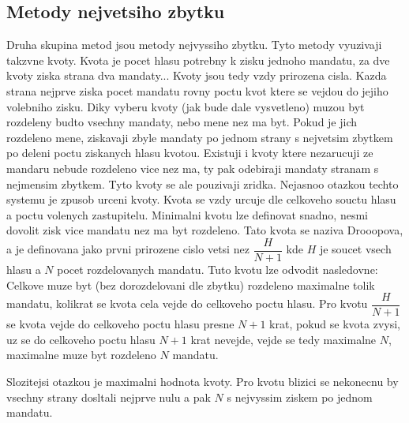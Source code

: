\documentclass[12pt,a4paper]{article}
\begin{document}
\subsection{Metody nejvetsiho zbytku}
Druha skupina metod jsou metody nejvyssiho zbytku.
Tyto metody vyuzivaji takzvne kvoty.
Kvota je pocet hlasu potrebny k zisku jednoho mandatu, za dve kvoty ziska strana dva mandaty...
Kvoty jsou tedy vzdy prirozena cisla.
Kazda strana nejprve ziska pocet mandatu rovny poctu kvot ktere se vejdou do jejiho volebniho zisku.
Diky vyberu kvoty (jak bude dale vysvetleno) muzou byt rozdeleny budto vsechny mandaty, nebo mene nez ma byt.
Pokud je jich rozdeleno mene, ziskavaji zbyle mandaty po jednom strany s nejvetsim zbytkem po deleni poctu ziskanych hlasu kvotou.
Existuji i kvoty ktere nezarucuji ze mandaru nebude rozdeleno vice nez ma, ty pak odebiraji mandaty stranam s nejmensim zbytkem.
Tyto kvoty se ale pouzivaji zridka.
Nejasnoo otazkou techto systemu je zpusob urceni kvoty.
Kvota se vzdy urcuje dle celkoveho souctu hlasu a poctu volenych zastupitelu.
Minimalni kvotu lze definovat snadno, nesmi dovolit zisk vice mandatu nez ma byt rozdeleno.
Tato kvota se naziva Drooopova, a je definovana jako prvni prirozene cislo vetsi nez $\dfrac{H}{N+1}$ kde $H$ je soucet vsech hlasu a $N$ pocet rozdelovanych mandatu.
Tuto kvotu lze odvodit nasledovne: Celkove muze byt (bez dorozdelovani dle zbytku) rozdeleno maximalne tolik mandatu, kolikrat se kvota cela vejde do celkoveho poctu hlasu.
Pro kvotu $\dfrac{H}{N+1}$ se kvota vejde do celkoveho poctu hlasu presne $N+1$ krat, pokud se kvota zvysi, uz se do celkoveho poctu hlasu $N+1$ krat nevejde, vejde se tedy maximalne $N$, maximalne muze byt rozdeleno $N$ mandatu.

Slozitejsi otazkou je maximalni hodnota kvoty.
Pro kvotu blizici se nekonecnu by vsechny strany dosltali nejprve nulu a pak $N$ s nejvyssim ziskem po jednom mandatu.

\end{document}
